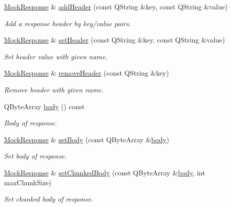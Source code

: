 \begin{DoxyCompactItemize}
\hyperlink{class_mock_response}{Mock\+Response} \& \hyperlink{class_mock_response_aae53cea1158c41083b0ba8326e650092}{add\+Header} (const Q\+String \&key, const Q\+String \&value)
\begin{DoxyCompactList}\small\item\em Add a response header by key/value pairs. \end{DoxyCompactList}\item 
\hyperlink{class_mock_response}{Mock\+Response} \& \hyperlink{class_mock_response_a6d094afe67ba40115b7b98c6316562e6}{set\+Header} (const Q\+String \&key, const Q\+String \&value)
\begin{DoxyCompactList}\small\item\em Set header value with given name. \end{DoxyCompactList}\item 
\hyperlink{class_mock_response}{Mock\+Response} \& \hyperlink{class_mock_response_a00eb3c9f357d1686e63f861a1b027525}{remove\+Header} (const Q\+String \&key)
\begin{DoxyCompactList}\small\item\em Remove header with given name. \end{DoxyCompactList}\item 
Q\+Byte\+Array \hyperlink{class_mock_response_a7498743de7e57dbc14835036063a8dec}{body} () const 
\begin{DoxyCompactList}\small\item\em Body of response. \end{DoxyCompactList}\item 
\hyperlink{class_mock_response}{Mock\+Response} \& \hyperlink{class_mock_response_a1334f45e12d9fe14900f314aa115d89e}{set\+Body} (const Q\+Byte\+Array \&\hyperlink{class_mock_response_a7498743de7e57dbc14835036063a8dec}{body})
\begin{DoxyCompactList}\small\item\em Set body of response. \end{DoxyCompactList}\item 
\hyperlink{class_mock_response}{Mock\+Response} \& \hyperlink{class_mock_response_a92b318654c0154afc3cab04ef35bbb09}{set\+Chunked\+Body} (const Q\+Byte\+Array \&\hyperlink{class_mock_response_a7498743de7e57dbc14835036063a8dec}{body}, int max\+Chunk\+Size)
\begin{DoxyCompactList}\small\item\em Set chunked body of response. \end{DoxyCompactList}\end{DoxyCompactItemize}



